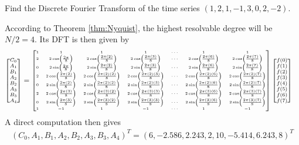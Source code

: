 \begin{exmp}
Find the Discrete Fourier Transform of the time series $(1,2,1,-1,3,0,2,-2)$.
\end{exmp}
\begin{solution}
According to Theorem \ref{thm:Nyquist}, the highest resolvable degree will be $N/2 = 4$. Its DFT is then given by
\begin{align*}
\scriptsize
\begin{bmatrix}
C_0 \\
A_1 \\
B_1 \\
A_2 \\
B_2 \\
A_3 \\
B_3 \\
A_4
\end{bmatrix}
&= 
\tiny
\begin{bmatrix}
1 & 1 & 1 & 1 & \cdots & 1 & 1 \\
2 & 2\cos(\frac{2\pi}{8}) & 2\cos(\frac{2\pi(2)}{8}) & 2\cos(\frac{2\pi(3)}{8}) & \cdots & 2\cos(\frac{2\pi(6)}{8}) & 2\cos(\frac{2\pi(7)}{8}) \\
0 & 2\sin(\frac{2\pi}{8}) & 2\sin(\frac{2\pi(2)}{8}) & 2\sin(\frac{2\pi(3)}{8}) & \cdots & 2\sin(\frac{2\pi(6)}{8}) & 2\sin(\frac{2\pi(7)}{8}) \\
2 & 2\cos(\frac{2\pi(2)}{8}) & 2\cos(\frac{2\pi(2)(2)}{8}) & 2\cos(\frac{2\pi(2)(3)}{8}) & \cdots & 2\cos(\frac{2\pi(2)(6)}{8}) & 2\cos(\frac{2\pi(2)(7)}{8}) \\
0 & 2\sin(\frac{2\pi(2)}{8}) & 2\sin(\frac{2\pi(2)(2)}{8}) & 2\sin(\frac{2\pi(2)(3)}{8}) & \cdots & 2\sin(\frac{2\pi(2)(6)}{8}) & 2\sin(\frac{2\pi(2)(7)}{8}) \\
2 & 2\cos(\frac{2\pi(3)}{8}) & 2\cos(\frac{2\pi(3)(2)}{8}) & 2\cos(\frac{2\pi(3)(3)}{8}) & \cdots & 2\cos(\frac{2\pi(3)(6)}{8}) & 2\cos(\frac{2\pi(3)(7)}{8}) \\
0 & 2\sin(\frac{2\pi(3)}{8}) & 2\sin(\frac{2\pi(3)(2)}{8}) & 2\sin(\frac{2\pi(3)(3)}{8}) & \cdots & 2\sin(\frac{2\pi(3)(6)}{8}) & 2\sin(\frac{2\pi(3)(7)}{8}) \\
1 & -1 & 1 & -1 & \cdots & 1 & -1
\end{bmatrix}
\scriptsize
\begin{bmatrix}
f(0)\\
f(1)\\
f(2)\\
f(3)\\
f(4)\\
f(5)\\
f(6)\\
f(7)
\end{bmatrix}     
\end{align*}
A direct computation then gives 
\begin{align*}
(C_0, A_1, B_1, A_2, B_2, A_3, B_3, A_4)^T = (6, -2.586, 2.243, 2, 10, -5.414, 6.243, 8)^T
\end{align*}
\end{solution}

